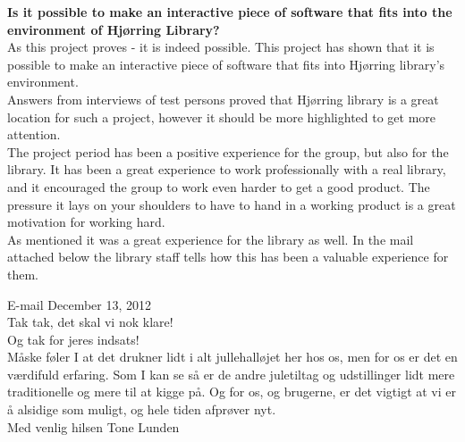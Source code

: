 \textbf{Is it possible to make an interactive piece of software that fits into the environment of Hj{\o}rring Library?}\\
As this project proves - it is indeed possible. This project has shown that it is possible to make an interactive piece of software that fits into Hj{\o}rring library's environment.\\
Answers from interviews of test persons proved that Hj{\o}rring library is a great location for such a project, however it should be more highlighted to get more attention. \\
The project period has been a positive experience for the group, but also for the library. It has been a great experience to work professionally with a real library, and it encouraged the group to work even harder to get a good product. The pressure it lays on your shoulders to have to hand in a working product is a great motivation for working hard. \\
As mentioned it was a great experience for the library as well. In the mail attached below the library staff tells how this has been a valuable experience for them.

\begin{fancyquotes}
E-mail December 13, 2012\\
Tak tak, det skal vi nok klare!\\

Og tak for jeres indsats!\\
M{\aa}ske f{\o}ler I at det drukner lidt i alt jullehall{\o}jet her hos os, men for os er det en v{\ae}rdifuld erfaring. Som I kan se s{\aa} er de andre juletiltag og udstillinger lidt mere traditionelle og mere til at kigge p{\aa}. Og for os, og brugerne, er det vigtigt at vi er {\aa} alsidige som muligt, og hele tiden afpr{\o}ver nyt.\\

Med venlig hilsen
Tone Lunden
\end{fancyquotes}

